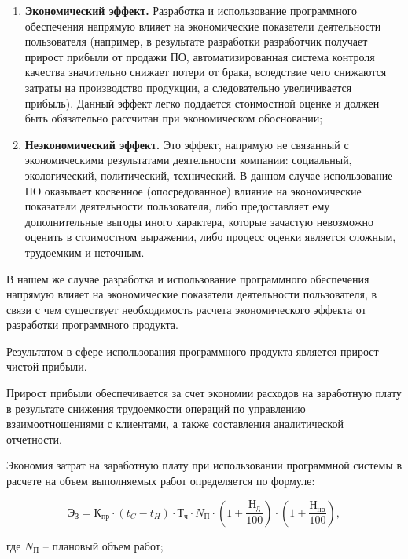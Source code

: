 \begin{enumerate}
    \item{\textbf{Экономический эффект.} Разработка и использование программного обеспечения напрямую влияет на экономические показатели деятельности пользователя (например, в результате разработки разработчик получает прирост прибыли от продажи ПО, автоматизированная система контроля качества значительно снижает потери от брака, вследствие чего снижаются затраты на производство продукции, а следовательно увеличивается прибыль). Данный эффект легко поддается стоимостной оценке и должен быть обязательно рассчитан при экономическом обосновании;}
    \item{\textbf{Неэкономический эффект.} Это эффект, напрямую не связанный с экономическими результатами деятельности компании: социальный, экологический, политический, технический. В данном случае использование ПО оказывает косвенное (опосредованное) влияние на экономические показатели деятельности пользователя, либо предоставляет ему дополнительные выгоды иного характера, которые зачастую невозможно оценить в стоимостном выражении, либо процесс оценки является сложным, трудоемким и неточным.}
   
\end{enumerate}

В нашем же случае разработка и использование программного обеспечения напрямую влияет на экономические показатели деятельности пользователя, в связи с чем существует необходимость расчета экономического эффекта от разработки программного продукта.

Результатом в сфере использования программного продукта является прирост чистой прибыли.

Прирост прибыли обеспечивается за счет экономии расходов на заработную плату в результате снижения трудоемкости операций по управлению взаимоотношениями с клиентами, а также составления аналитической отчетности.

Экономия затрат на заработную плату при использовании программной системы в расчете на объем выполняемых работ определяется по формуле:

\begin{equation}
    \text{Э}_{\text{З}} = \text{К}_{\text{пр}}\cdot (t_{C}-t_{H})\cdot \text{Т}_{\text{ч}}\cdot N_{\text{П}}\cdot  (1+\frac{\text{Н}_{\text{д}}}{100})\cdot (1+\frac{\text{Н}_{\text{но}}}{100}), 
\end{equation}

где $N_{\text{П}}$ -- плановый объем работ; 

